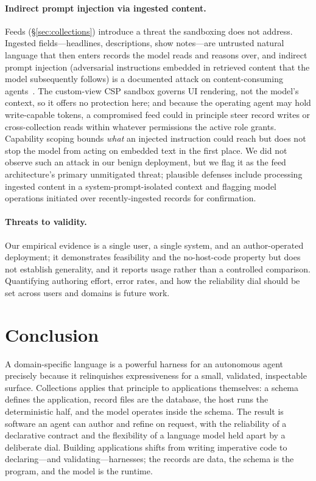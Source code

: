 \documentclass[11pt]{article}
\begin{document}
\paragraph{Indirect prompt injection via ingested content.}
Feeds (\S\ref{sec:collections}) introduce a threat the sandboxing does not address.
Ingested fields---headlines, descriptions, show notes---are untrusted natural
language that then enters records the model reads and reasons over, and indirect
prompt injection (adversarial instructions embedded in retrieved content that the
model subsequently follows) is a documented attack on content-consuming
agents~\citep{greshake2023injection}. The custom-view CSP sandbox governs UI
rendering, not the model's context, so it offers no protection here; and because
the operating agent may hold write-capable tokens, a compromised feed could in
principle steer record writes or cross-collection reads within whatever permissions
the active role grants. Capability scoping bounds \emph{what} an injected
instruction could reach but does not stop the model from acting on embedded text in
the first place. We did not observe such an attack in our benign deployment, but we
flag it as the feed architecture's primary unmitigated threat; plausible defenses
include processing ingested content in a system-prompt-isolated context and
flagging model operations initiated over recently-ingested records for confirmation.

\paragraph{Threats to validity.}
Our empirical evidence is a single user, a single system, and an author-operated
deployment; it demonstrates feasibility and the no-host-code property but does not
establish generality, and it reports usage rather than a controlled comparison.
Quantifying authoring effort, error rates, and how the reliability dial should be
set across users and domains is future work.

\section{Conclusion}
\label{sec:conclusion}

A domain-specific language is a powerful harness for an autonomous agent precisely
because it relinquishes expressiveness for a small, validated, inspectable
surface. Collections applies that principle to applications themselves: a schema
defines the application, record files are the database, the host runs the
deterministic half, and the model operates inside the schema. The result is
software an agent can author and refine on request, with the reliability of a
declarative contract and the flexibility of a language model held apart by a
deliberate dial. Building applications shifts from writing imperative code to
declaring---and validating---harnesses; the records are data, the schema is the
program, and the model is the runtime.
\end{document}
